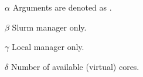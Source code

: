 \begin{table}
\begin{threeparttable}
        \begin{tablenotes}
            \footnotesize
            \item[$\alpha$] Arguments are denoted as \code{[argument]}.
            \item[$\beta$] Slurm manager only.
            \item[$\gamma$] Local manager only.
            \item[$\delta$] Number of available (virtual) cores.
        \end{tablenotes}
    \end{threeparttable}
\end{table}
